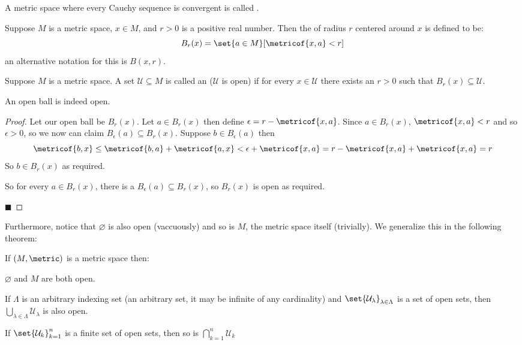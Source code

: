 \documentclass[10pt]{article}
\def\mU{\mathcal{U}}
\begin{document}
\begin{defn*}

    A metric space where every Cauchy sequence is convergent is called .

\end{defn*}

\begin{defn*}

    Suppose $M$ is a metric space, $x\in M$, and $r>0$ is a positive real number.
    Then the  of radius $r$ centered around $x$ is defined to be:
    \[ B_r(x) = \set{a\in M}[\metricof{x,a}<r] \]
    an alternative notation for this is $B(x,r)$.

\end{defn*}

\begin{defn*}

    Suppose $M$ is a metric space.
    A set $\mU\subseteq M$ is called an  ($\mU$ is open) if for every $x\in\mU$ there exists an $r>0$ such that $B_r(x)\subseteq\mU$.

\end{defn*}

\begin{prop*}

    An open ball is indeed open.

\end{prop*}

\begin{proof}

    Let our open ball be $B_r(x)$.
    Let $a\in B_r(x)$ then define $\epsilon=r-\metricof{x,a}$.
    Since $a\in B_r(x)$, $\metricof{x,a}<r$ and so $\epsilon>0$, so we now can claim $B_\epsilon(a)\subseteq B_r(x)$.
    Suppose $b\in B_\epsilon(a)$ then
    \[ \metricof{b,x}\leq\metricof{b,a}+\metricof{a,x}<\epsilon+\metricof{x,a}=r-\metricof{x,a}+\metricof{x,a} = r \]
    So $b\in B_r(x)$ as required.

    So for every $a\in B_r(x)$, there is a $B_\epsilon(a)\subseteq B_r(x)$, so $B_r(x)$ is open as required.

    \hfill$\blacksquare$

\end{proof}

Furthermore, notice that $\varnothing$ is also open (vaccuously) and so is $M$, the metric space itself (trivially).
We generalize this in the following theorem:

\begin{thrm*}

    If $(M,\metric)$ is a metric space then:
    \benum
        \item $\varnothing$ and $M$ are both open.
        \item If $\Lambda$ is an arbitrary indexing set (an arbitrary set, it may be infinite of any cardinality) and $\set{\mU_\lambda}_{\lambda\in\Lambda}$ is a set of open sets, then
        $\bigcup_{\lambda\in\Lambda}\mU_\lambda$ is also open.
        \item If $\set{\mU_k}_{k=1}^n$ is a finite set of open sets, then so is $\bigcap_{k=1}^n\mU_k$
    \eenum

\end{thrm*}
\end{document}
